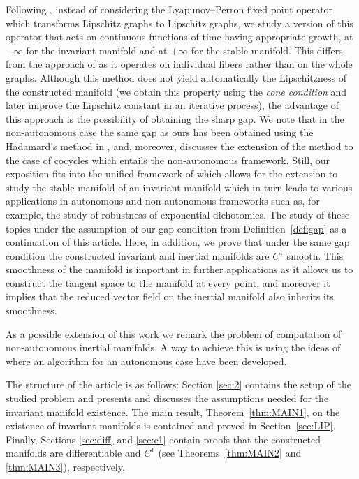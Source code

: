 \documentclass[a4paper,11pt,reqno]{amsart}
\theoremstyle{plain}
\theoremstyle{definition}
\numberwithin{equation}{section}
\begin{document}
Following \cite{CR96,LL99}, instead of considering the Lyapunov--Perron fixed point operator which transforms Lipschitz graphs to Lipschitz graphs, we study a version of this operator that acts on continuous functions of time having appropriate growth, at $-\infty$ for the invariant manifold and at $+\infty$ for the stable manifold. This differs from the approach of \cite{CLMO-S25} as it operates on individual fibers rather than on the whole graphs. Although this method does not yield automatically the Lipschitzness of the constructed manifold (we obtain this property using the \textit{cone condition} and later improve the Lipschitz constant in an iterative process), the advantage of this approach is the possibility of obtaining the sharp gap. We note that in the non-autonomous case the same gap as ours has been obtained using the Hadamard's method in \cite{KS02}, and, moreover, \cite[Section 6]{LL99} discusses the extension of the method to the case of cocycles which entails the non-autonomous framework. Still, our exposition fits into the unified framework of \cite{CLMO-S25} which allows for the extension to study the stable manifold of an invariant manifold which in turn leads to various applications in autonomous and non-autonomous frameworks such as, for example, the study of robustness of exponential dichotomies. The study of these topics under the assumption of our gap condition from Definition~\ref{def:gap} as a continuation of this article. Here, in addition, we prove that under the same gap condition the constructed invariant and inertial manifolds are $C^1$ smooth. 
This smoothness of the manifold is important in  further applications as it allows us to construct the tangent space to the manifold at every point, and moreover it implies that the reduced
vector field on the inertial manifold also inherits its smoothness. 

As a possible extension of this work we remark the problem of computation of non-autonomous inertial manifolds. A way to achieve this is using the ideas of \cite{JRT} where an algorithm for an autonomous case have been developed. 
 
The structure of the article is as follows: Section \ref{sec:2} contains  the setup of the studied problem and presents and discusses the assumptions needed for the invariant manifold existence. The main result, Theorem~\ref{thm:MAIN1}, on the existence of invariant manifolds is contained and proved in Section~\ref{sec:LIP}. Finally, Sections \ref{sec:diff} and \ref{sec:c1} contain proofs that the constructed manifolds are differentiable and $C^1$ (see Theorems~\ref{thm:MAIN2} and \ref{thm:MAIN3}), respectively. 
\end{document}

